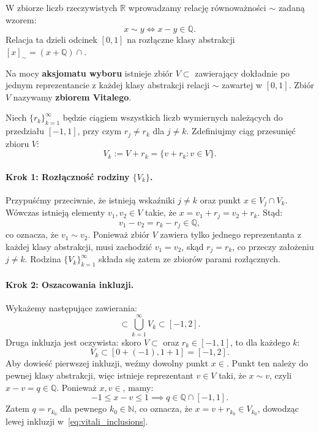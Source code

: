 \begin{dow}
    W zbiorze liczb rzeczywistych $\mathbb{R}$ wprowadzamy relację równoważności $\sim$ zadaną wzorem:
    \begin{equation*}
        x \sim y \iff x - y \in \mathbb{Q}.
    \end{equation*}
    Relacja ta dzieli odcinek $[0, 1]$ na rozłączne klasy abstrakcji $[x]_\sim = (x + \mathbb{Q}) \cap$.

    Na mocy \textbf{aksjomatu wyboru} istnieje zbiór $V \subset$ zawierający dokładnie po jednym reprezentancie z każdej klasy abstrakcji relacji $\sim$ zawartej w $[0, 1]$. Zbiór $V$ nazywamy \textbf{zbiorem Vitalego}.

    Niech $\{r_k\}_{k=1}^\infty$ będzie ciągiem wszystkich liczb wymiernych należących do przedziału $[-1, 1]$, przy czym $r_j \neq r_k$ dla $j \neq k$. Zdefiniujmy ciąg przesunięć zbioru $V$:
    \begin{equation*}
        V_k := V + r_k = \{v + r_k \colon v \in V\}.
    \end{equation*}

    \paragraph{Krok 1: Rozłączność rodziny $\{V_k\}$.}
    Przypuśćmy przeciwnie, że istnieją wskaźniki $j \neq k$ oraz punkt $x \in V_j \cap V_k$. Wówczas istnieją elementy $v_1, v_2 \in V$ takie, że $x = v_1 + r_j = v_2 + r_k$. Stąd:
    \begin{equation*}
        v_1 - v_2 = r_k - r_j \in \mathbb{Q},
    \end{equation*}
    co oznacza, że $v_1 \sim v_2$. Ponieważ zbiór $V$ zawiera tylko jednego reprezentanta z każdej klasy abstrakcji, musi zachodzić $v_1 = v_2$, skąd $r_j = r_k$, co przeczy założeniu $j \neq k$. Rodzina $\{V_k\}_{k=1}^\infty$ składa się zatem ze zbiorów parami rozłącznych.

    \paragraph{Krok 2: Oszacowania inkluzji.}
    Wykażemy następujące zawierania:
    \begin{equation}\label{eq:vitali_inclusions}
        \subset \bigcup_{k=1}^\infty V_k \subset [-1, 2].
    \end{equation}
    Druga inkluzja jest oczywista: skoro $V \subset$ oraz $r_k \in [-1, 1]$, to dla każdego $k$:
    \begin{equation*}
        V_k \subset [0 + (-1), 1 + 1] = [-1, 2].
    \end{equation*}
    Aby dowieść pierwszej inkluzji, weźmy dowolny punkt $x \in$. Punkt ten należy do pewnej klasy abstrakcji, więc istnieje reprezentant $v \in V$ taki, że $x \sim v$, czyli $x - v = q \in \mathbb{Q}$. Ponieważ $x, v \in$, mamy:
    \begin{equation*}
        -1 \le x - v \le 1 \implies q \in \mathbb{Q} \cap [-1, 1].
    \end{equation*}
    Zatem $q = r_{k_0}$ dla pewnego $k_0 \in \mathbb{N}$, co oznacza, że $x = v + r_{k_0} \in V_{k_0}$, dowodząc lewej inkluzji w~\eqref{eq:vitali_inclusions}.


\end{dow}
